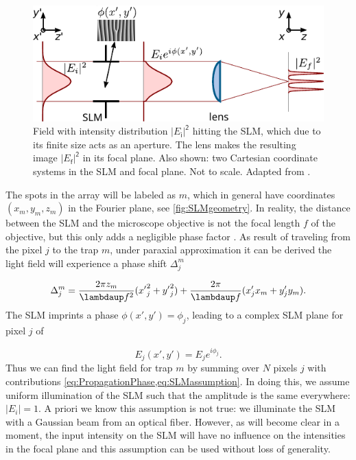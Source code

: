 \begin{figure}
    \centering
    \includegraphics[width = 13cm]{figures/SLMfigure.pdf}
    \caption{Field with intensity distribution $\mathsf{|\textit{E}_i|^2}$ hitting the SLM, which due to its finite size acts as an aperture.
    The lens makes the resulting image $\mathsf{|\textit{E}_f|^2}$ in its focal plane.
    Also shown: two Cartesian coordinate systems in the SLM and focal plane. 
    Not to scale. 
    Adapted from \cite{Labuhn2016}.}
    \label{fig:SLMLens}
\end{figure}

The spots in the array will be labeled as $m$, which in general have coordinates $(x_m, y_m, z_m)$ in the Fourier plane, see \cref{fig:SLMgeometry}.
In reality, the distance between the SLM and the microscope objective is not the focal length $f$ of the objective, but this only adds a negligible phase factor \cite{Bijnen2013}.
As result of traveling from the pixel $j$ to the trap $m$, under paraxial approximation it can be derived the light field will experience a phase shift $\Delta_j^m$ \cite{DiLeonardo2007}

\begin{equation}\label{eq:PropagationPhase}
    \Delta_j^m = 
    \frac{2\pi z_m}{\lambdaup f^2} ({x'}_{j}^{2} + {y'}_{j}^{2}) 
    + \frac{2\pi}{\lambdaup f}(x'_j x_m + y'_j y_m).
\end{equation}
The SLM imprints a phase $\phi(x',y') = \phi_j$, leading to a complex SLM plane for pixel $j$ of

\begin{equation}\label{eq:SLMassumption}
    E_j(x',y') = E_j e^{i \phi_j}.
\end{equation}
Thus we can find the light field for trap $m$ by summing over $N$ pixels $j$ with contributions \cref{eq:PropagationPhase,eq:SLMassumption}.
In doing this, we assume uniform illumination of the SLM such that the amplitude is the same everywhere: $|E_i| = 1$.
A priori we know this assumption is not true: we illuminate the SLM with a Gaussian beam from an optical fiber.
However, as will become clear in a moment, the input intensity on the SLM will have no influence on the intensities in the focal plane and this assumption can be used without loss of generality.

